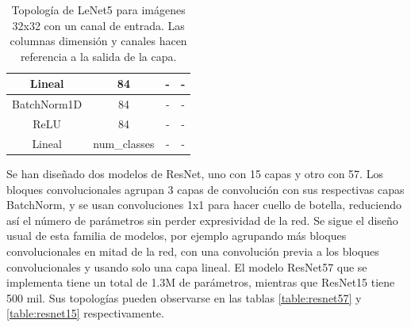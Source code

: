 \begin{table}[]
\begin{tabular}{|c|c|c|c|}
Lineal                         & 84                                  & -                                & -                                 \\ \hline
BatchNorm1D                    & 84                                  & -                                & -                                 \\ \hline
ReLU                           & 84                                  & -                                & -                                 \\ \hline
Lineal                         & num\_classes                        & -                                & -                                 \\ \hline
\end{tabular}
\caption{Topología de LeNet5 para imágenes 32x32 con un canal de entrada. Las columnas dimensión y canales hacen referencia a la salida de la capa.}
\label{table:lenet5}
\end{table}


Se han diseñado dos modelos de ResNet, uno con 15 capas y otro con 57. Los bloques convolucionales agrupan 3 capas de convolución con sus respectivas capas BatchNorm, y se usan convoluciones 1x1 para hacer cuello de botella, reduciendo así el número de parámetros sin perder expresividad de la red. Se sigue el diseño usual de esta familia de modelos, por ejemplo agrupando más bloques convolucionales en mitad de la red, con una convolución previa a los bloques convolucionales y usando solo una capa lineal. El modelo ResNet57 que se implementa tiene un total de 1.3M de parámetros, mientras que ResNet15 tiene 500 mil. Sus topologías pueden observarse en las tablas \ref{table:resnet57} y \ref{table:resnet15} respectivamente. 


